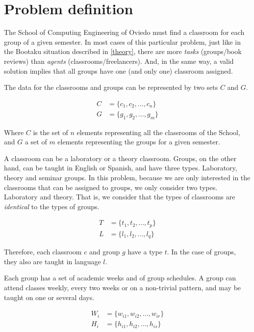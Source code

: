 \renewcommand{\documentname}{Problem definition}

\chapter{Problem definition}

The School of Computing Engineering of Oviedo must find a classroom for each group of a given semester. In most cases of this particular problem, just like in the Bootaku situation described in \ref{theory}, there are more \textit{tasks} (groups/book reviews) than \textit{agents} (classrooms/freelancers). And, in the same way, a valid solution implies that all groups have one (and only one) classroom assigned.

The data for the classrooms and groups can be represented by two sets $C$ and $G$. 

\begin{align}
    C &= \{ c_{1}, c_{2}, ..., c_{n} \}\\
    G &= \{ g_{1}, g_{2}, ..., g_{m} \}
\end{align}

Where $C$ is the set of $n$ elements representing all the classrooms of the School, and $G$ a set of $m$ elements representing the groups for a given semester.

A classroom can be a laboratory or a theory classroom. Groups, on the other hand, can be taught in English or Spanish, and have three types. Laboratory, theory and seminar groups. In this problem, because we are only interested in the classrooms that can be assigned to groups, we only consider two types. Laboratory and theory. That is, we consider that the types of classrooms are \textit{identical} to the types of groups.

\begin{align}
    T &= \{ t_{1}, t_{2}, ..., t_{p} \}\\
    L &= \{ l_{1}, l_{2}, ..., l_{q} \}
\end{align}

Therefore, each classroom $c$ and group $g$ have a type $t$. In the case of groups, they also are taught in language $l$.

Each group has a set of academic weeks and of group schedules. A group can attend classes weekly, every two weeks or on a non-trivial pattern, and may be taught on one or several days.

\begin{align}
    W_{i} &= \{ w_{i1}, w_{i2}, ..., w_{ir} \}\\
    H_{i} &= \{ h_{i1}, h_{i2}, ..., h_{is} \}
\end{align}

